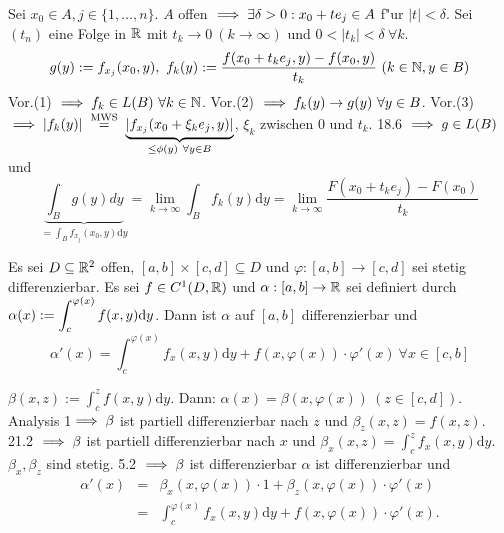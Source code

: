 \documentclass{article}
\begin{document}
\begin{beweis}
Sei $x_0\in A, j\in \{1,\ldots, n\}$. $A$ offen $\implies\exists \delta>0:x_0+te_j\in A$ f"ur $|t|<\delta$. Sei $(t_n)$ eine Folge in $\mathbb{R}$ mit $t_k\to 0\ (k\to\infty)$ und $0<|t_k|<\delta\ \forall k$.\\
\[g(y):=f_{x_j}(x_0, y),\ f_k(y):=\frac{f(x_0+t_ke_j,y)-f(x_0,y)}{t_k}\ (k\in \MdN, y\in B)\]
Vor.(1) $\folgt f_k\in L(B)\ \forall k\in \MdN$.
Vor.(2) $\implies f_k(y)\to g(y)\ \forall y\in B$.
Vor.(3) $\folgt |f_k(y)|\gleichnach{MWS}\underbrace{|f_{x_j}(x_0+\xi_ke_j,y)|}_{\le\phi(y)\ \forall y\in B}$, $\xi_k$ zwischen 0 und $t_k$.
18.6 $\implies g\in L(B)$ und 
\[\underbrace{\int_B g(y)dy}_{=\int_B f_{x_j}(x_0,y)\text{d}y}=\lim_{k\to\infty}\int_Bf_k(y)\text{d}y=\lim_{k\to\infty}\frac{F(x_0+t_ke_j)-F(x_0)}{t_k}\]
$ $
\end{beweis}

\begin{satz}
Es sei $D\subseteq\mathbb{R}^2$ offen, $[a,b]\times[c,d]\subseteq D$ und $\varphi:[a,b]\to[c,d]$ sei stetig differenzierbar. Es sei $f\in C^1(D,\mathbb{R})$ und $\alpha:[a,b]\to\mathbb{R}$ sei definiert durch $\alpha(x):=\displaystyle\int_c^{\varphi(x)}f(x,y)\text{d}y$.
Dann ist $\alpha$ auf $[a,b]$ differenzierbar und
\[
	\alpha'(x)=\int_c^{\varphi(x)}f_x(x,y)\text{d}y+f(x,\varphi(x))\cdot\varphi'(x)\ \forall x\in [c,b]
\]
\end{satz}

\begin{beweis}
$\beta(x,z):=\int_c^z f(x,y)\text{d}y$. Dann: $\alpha(x)=\beta(x,\varphi(x))\ (z\in[c,d])$.
Analysis 1$\implies \beta$ ist partiell differenzierbar nach $z$ und $\beta_z(x,z)=f(x,z)$.
21.2 $\implies \beta$ ist partiell differenzierbar nach $x$ und $\beta_x(x,z)=\int_c^z f_x(x,y)\text{d}y$. $\beta_x, \beta_z$ sind stetig.
5.2 $\implies \beta$ ist differenzierbar  $\alpha$ ist differenzierbar und 
\begin{eqnarray*}
\alpha'(x)&=&\beta_x(x,\varphi(x))\cdot 1 + \beta_z(x,\varphi(x))\cdot \varphi'(x)\\
&=&\int_c^{\varphi(x)}f_x(x,y)\text{d}y+f(x,\varphi(x))\cdot\varphi'(x).
\end{eqnarray*}
\end{beweis}
\end{document}
